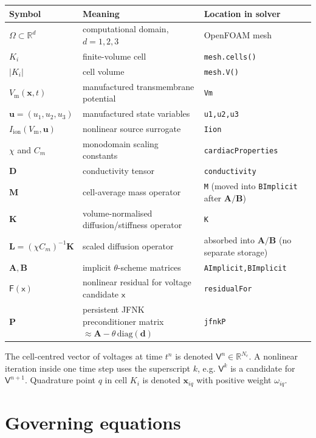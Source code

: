 \documentclass[11pt,a4paper]{article}
\newcommand{\code}[1]{\texttt{\small #1}}
\newcommand{\Vm}{V_{\text{m}}}
\newcommand{\Iion}{I_{\mathrm{ion}}}
\newcommand{\Dten}{\mathbf{D}}
\newcommand{\Mmass}{\mathbf{M}}
\newcommand{\Kstif}{\mathbf{K}}
\newcommand{\Lop}{\mathbf{L}}
\newcommand{\Aimp}{\mathbf{A}}
\newcommand{\Bimp}{\mathbf{B}}
\newcommand{\Fres}{\mathsf{F}}
\newcommand{\R}{\mathbb{R}}
\begin{document}
\begin{center}
\begin{tabular}{@{}lll@{}}
\toprule
Symbol & Meaning & Location in solver \\
\midrule
$\Omega\subset\R^d$ & computational domain, $d=1,2,3$ & OpenFOAM mesh \\
$K_i$ & finite-volume cell & \code{mesh.cells()} \\
$|K_i|$ & cell volume & \code{mesh.V()} \\
$\Vm(\mathbf{x},t)$ & manufactured transmembrane potential & \code{Vm} \\
$\mathbf{u}=(u_1,u_2,u_3)$ & manufactured state variables & \code{u1,u2,u3} \\
$\Iion(\Vm,\mathbf{u})$ & nonlinear source surrogate & \code{Iion} \\
$\chi$ and $C_m$ & monodomain scaling constants & \code{cardiacProperties} \\
$\Dten$ & conductivity tensor & \code{conductivity} \\
$\Mmass$ & cell-average mass operator & \code{M} (moved into \code{BImplicit} after $\Aimp/\Bimp$) \\
$\Kstif$ & volume-normalised diffusion/stiffness operator & \code{K} \\
$\Lop=(\chi C_m)^{-1}\Kstif$ & scaled diffusion operator & absorbed into $\Aimp/\Bimp$ (no separate storage) \\
$\Aimp,\Bimp$ & implicit $\theta$-scheme matrices & \code{AImplicit,BImplicit} \\
$\Fres(\mathsf{x})$ & nonlinear residual for voltage candidate $\mathsf{x}$ & \code{residualFor} \\
$\mathbf{P}$ & persistent JFNK preconditioner matrix $\approx\Aimp-\theta\,\mathrm{diag}(\mathbf{d})$ & \code{jfnkP} \\
\bottomrule
\end{tabular}
\end{center}

The cell-centred vector of voltages at time $t^n$ is denoted
$\mathsf{V}^n\in\R^{N_c}$. A nonlinear iteration inside one time step uses the
superscript $k$, e.g. $\mathsf{V}^k$ is a candidate for
$\mathsf{V}^{n+1}$. Quadrature point $q$ in cell $K_i$ is denoted
$\mathbf{x}_{iq}$ with positive weight $\omega_{iq}$.

\section{Governing equations}
\end{document}
